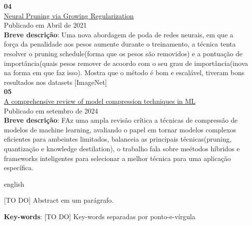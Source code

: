 \begin{resumo}
\textbf{04}
\\
\href{https://arxiv.org/pdf/2012.09243}{Neural Pruning via Growing Regularization}
\\
Publicado em Abril de 2021
\\
\textbf{Breve descrição}:
Uma nova abordagem de poda de redes neurais, em que a força da penalidade aos pesos aumente durante o treinamento, a técnica tenta resolver o pruning schedule(forma que os pesos são removidos) e a pontuação de importância(quais pesos remover de acoordo com o seu grau de importância(inova na forma em que faz isso).
Mostra que o método é bom e escalável, tiveram bons resultados nos datasets [ImageNet]
\\
\textbf{05}
\\
\href{https://link.springer.com/article/10.1007/s10489-024-05747-w}{A comprehensive review of model compression techniques in ML}
\\
Publicado em setembro de 2024
\\
\textbf{Breve descrição}:
FAz uma ampla revisão crítica a técnicas de compressão de modelos de machine learning, avaliando o papel em tornar modelos complexos eficientes para ambeintes limitados, balanceia as principais técnicas(pruning, quantização e knowledge destilation), o trabalho fala sobre meétodos híbridos  e frameworks inteligentes para selecionar a melhor técnica para uma aplicação específica.
\end{resumo}

\begin{resumo}
 \begin{otherlanguage*}{english}

[TO DO] Abstract em um parágrafo.
    
   \vspace{\onelineskip}
 
   \noindent 
   \textbf{Key-words}: [TO DO] Key-words separadas por ponto-e-vírgula
 \end{otherlanguage*}
\end{resumo}

\listoffigures*
\cleardoublepage

\listoftables*
\cleardoublepage

